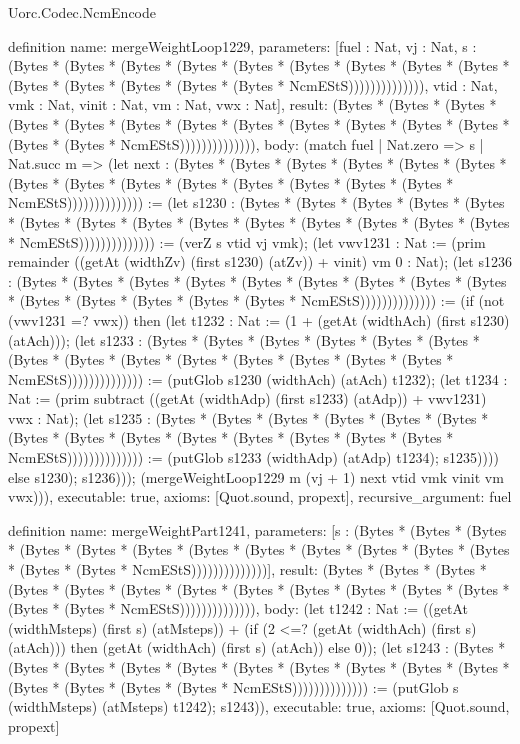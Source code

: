 \begin{lexlean}{Uorc.Codec.NcmEncode}
\begin{semanticmodule}
definition{
  name: mergeWeightLoop1229,
  parameters: [fuel : Nat, vj : Nat, s : (Bytes * (Bytes * (Bytes * (Bytes * (Bytes * (Bytes * (Bytes * (Bytes * (Bytes * (Bytes * (Bytes * (Bytes * (Bytes * (Bytes * NcmEStS)))))))))))))), vtid : Nat, vmk : Nat, vinit : Nat, vm : Nat, vwx : Nat],
  result: (Bytes * (Bytes * (Bytes * (Bytes * (Bytes * (Bytes * (Bytes * (Bytes * (Bytes * (Bytes * (Bytes * (Bytes * (Bytes * (Bytes * NcmEStS)))))))))))))),
  body: (match fuel
    | Nat.zero => s
    | Nat.succ m => (let next : (Bytes * (Bytes * (Bytes * (Bytes * (Bytes * (Bytes * (Bytes * (Bytes * (Bytes * (Bytes * (Bytes * (Bytes * (Bytes * (Bytes * NcmEStS)))))))))))))) := (let s1230 : (Bytes * (Bytes * (Bytes * (Bytes * (Bytes * (Bytes * (Bytes * (Bytes * (Bytes * (Bytes * (Bytes * (Bytes * (Bytes * (Bytes * NcmEStS)))))))))))))) := (verZ s vtid vj vmk); (let vwv1231 : Nat := (prim remainder ((getAt (widthZv) (first s1230) (atZv)) + vinit) vm 0 : Nat); (let s1236 : (Bytes * (Bytes * (Bytes * (Bytes * (Bytes * (Bytes * (Bytes * (Bytes * (Bytes * (Bytes * (Bytes * (Bytes * (Bytes * (Bytes * NcmEStS)))))))))))))) := (if (not (vwv1231 =? vwx)) then (let t1232 : Nat := (1 + (getAt (widthAch) (first s1230) (atAch))); (let s1233 : (Bytes * (Bytes * (Bytes * (Bytes * (Bytes * (Bytes * (Bytes * (Bytes * (Bytes * (Bytes * (Bytes * (Bytes * (Bytes * (Bytes * NcmEStS)))))))))))))) := (putGlob s1230 (widthAch) (atAch) t1232); (let t1234 : Nat := (prim subtract ((getAt (widthAdp) (first s1233) (atAdp)) + vwv1231) vwx : Nat); (let s1235 : (Bytes * (Bytes * (Bytes * (Bytes * (Bytes * (Bytes * (Bytes * (Bytes * (Bytes * (Bytes * (Bytes * (Bytes * (Bytes * (Bytes * NcmEStS)))))))))))))) := (putGlob s1233 (widthAdp) (atAdp) t1234); s1235)))) else s1230); s1236))); (mergeWeightLoop1229 m (vj + 1) next vtid vmk vinit vm vwx))),
  executable: true,
  axioms: [Quot.sound, propext],
  recursive_argument: fuel
}

definition{
  name: mergeWeightPart1241,
  parameters: [s : (Bytes * (Bytes * (Bytes * (Bytes * (Bytes * (Bytes * (Bytes * (Bytes * (Bytes * (Bytes * (Bytes * (Bytes * (Bytes * (Bytes * NcmEStS))))))))))))))],
  result: (Bytes * (Bytes * (Bytes * (Bytes * (Bytes * (Bytes * (Bytes * (Bytes * (Bytes * (Bytes * (Bytes * (Bytes * (Bytes * (Bytes * NcmEStS)))))))))))))),
  body: (let t1242 : Nat := ((getAt (widthMsteps) (first s) (atMsteps)) + (if (2 <=? (getAt (widthAch) (first s) (atAch))) then (getAt (widthAch) (first s) (atAch)) else 0)); (let s1243 : (Bytes * (Bytes * (Bytes * (Bytes * (Bytes * (Bytes * (Bytes * (Bytes * (Bytes * (Bytes * (Bytes * (Bytes * (Bytes * (Bytes * NcmEStS)))))))))))))) := (putGlob s (widthMsteps) (atMsteps) t1242); s1243)),
  executable: true,
  axioms: [Quot.sound, propext]
}


\end{semanticmodule}
\end{lexlean}
